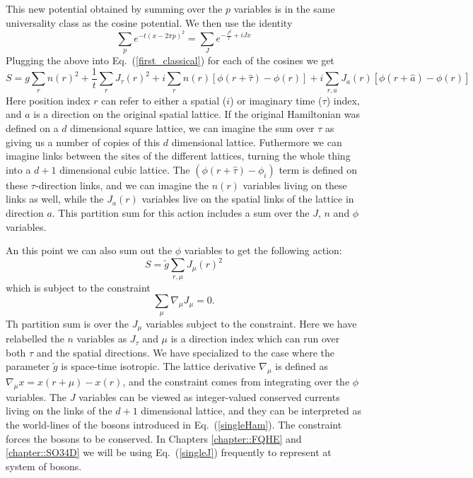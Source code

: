 This new potential obtained by summing over the $p$ variables is in the same universality class as the cosine potential. We then use the identity
\begin{equation}
\sum_p e^{-t(x-2\pi p)^2}=\sum_{J} e^{-\frac{J^2}{t}+iJ x}
\label{Villain2}
\end{equation}
Plugging the above into Eq.~(\ref{first_classical}) for each of the cosines we get
\begin{equation}
S=g\sum_{r} n(r)^2 + \frac{1}{t}\sum_r J_\tau(r)^2 + i\sum_r n(r) [\phi(r+\hat\tau)-\phi(r)] + i\sum_{r,a} J_{a}(r) [\phi(r+\hat a)-\phi(r)]
\end{equation}
Here position index $r$ can refer to either a spatial ($i$) or imaginary time ($\tau$) index, and $a$ is a direction on the original spatial lattice. If the original Hamiltonian was defined on a $d$ dimensional square lattice, we can imagine the sum over $\tau$ as giving us a number of copies of this $d$ dimensional lattice. Futhermore we can imagine links between the sites of the different lattices, turning the whole thing into a $d+1$ dimensional cubic lattice. The $(\phi(r+\hat\tau)-\phi_i)$ term is defined on these $\tau$-direction links, and we can imagine the $n(r)$ variables living on these links as well, while the $J_a(r)$ variables live on the spatial links of the lattice in direction $a$. This partition sum for this action includes a sum over the $J$, $n$ and $\phi$ variables.

An this point we can also sum out the $\phi$ variables to get the following action:
\begin{equation}
S=\tilde g\sum_{r,\mu} J_\mu(r)^2
\label{singleJ}
\end{equation}
which is subject to the constraint 
\begin{equation}
\sum_\mu \nabla_\mu J_\mu=0.
\label{constraint}
\end{equation}
Th partition sum is over the $J_\mu$ variables subject to the constraint. Here we have relabelled the $n$ variables as $J_\tau$ and $\mu$ is a direction index which can run over both $\tau$ and the spatial directions. We have specialized to the case where the parameter $\tilde g$ is space-time isotropic. The lattice derivative $\nabla_\mu$ is defined as $\nabla_\mu x= x(r+\mu)-x(r)$, and the constraint comes from integrating over the $\phi$ variables. The $J$ variables can be viewed as integer-valued conserved currents living on the links of the $d+1$ dimensional lattice, and they can be interpreted as the world-lines of the bosons introduced in Eq.~(\ref{singleHam}). The constraint forces the bosons to be conserved. In Chapters \ref{chapter::FQHE} and \ref{chapter::SO34D} we will be using Eq.~(\ref{singleJ}) frequently to represent at system of bosons.

